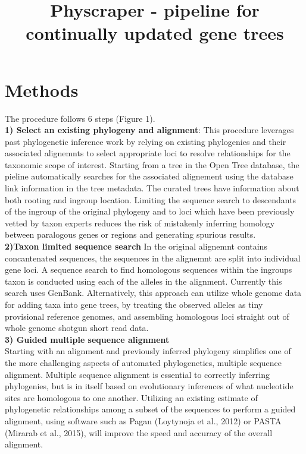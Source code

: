 \documentclass[a4paper,10pt]{article}
\title{Physcraper - pipeline for continually updated gene trees}
\author{}
\begin{document}
\maketitle

\begin{abstract}

\end{abstract}

\section{Methods}
The procedure follows 6 steps (Figure 1).\\

\textbf{1) Select an existing phylogeny and alignment}:
This procedure leverages past phylogenetic inference work by relying on existing phylogenies and their associated alignemnts to select appropriate loci to resolve relationships for the taxonomic scope of interest.
Starting from a tree in the Open Tree database, the pieline automatically searches for the associated alignement using the database link information in the tree metadata. 
The curated trees have information about both rooting and ingroup location. Limiting the sequence search to descendants of the ingroup of the original phylogeny 
and to loci which have been previously vetted by taxon experts reduces the risk of mistakenly inferring homology between paralogous genes or regions and generating spurious results.\\

 \textbf{2)Taxon limited sequence search} 
In the original alignemnt contains concantenated sequences, the sequences in the alignemnt are split into individual gene loci.
A sequence search to find homologous sequences within the ingroups taxon is conducted using each of the alleles in the alignment.
Currently this search uses GenBank.
Alternatively, this approach can utilize whole genome data for adding taxa into gene trees, by treating the observed alleles as tiny provisional reference genomes, 
and assembling homologous loci straight out of whole genome shotgun short read data.\\

\textbf{3) Guided multiple sequence alignment}\\
Starting with an alignment and previously inferred phylogeny simplifies one of the more challenging aspects of automated phylogenetics, multiple sequence alignment.
Multiple sequence alignment is essential to correctly inferring phylogenies, but is in itself based on evolutionary inferences of what nucleotide sites are homologous to one another.
Utilizing an existing estimate of phylogenetic relationships among a subset of the sequences to perform a guided alignment, 
using software such as Pagan (Loytynoja et al., 2012) or PASTA (Mirarab et al., 2015), will improve the speed and accuracy of the overall alignment.
\end{document}
